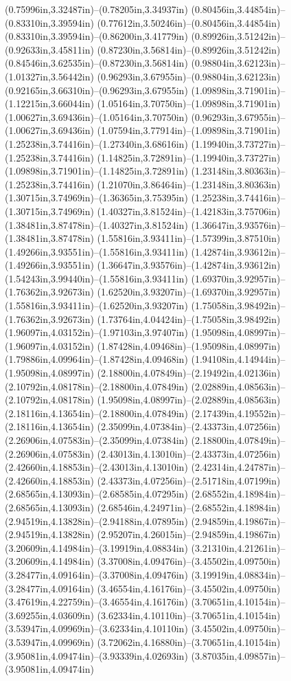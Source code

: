 (0.75996in,3.32487in)--(0.78205in,3.34937in) (0.80456in,3.44854in)--(0.83310in,3.39594in) (0.77612in,3.50246in)--(0.80456in,3.44854in) (0.83310in,3.39594in)--(0.86200in,3.41779in) (0.89926in,3.51242in)--(0.92633in,3.45811in) (0.87230in,3.56814in)--(0.89926in,3.51242in) (0.84546in,3.62535in)--(0.87230in,3.56814in) (0.98804in,3.62123in)--(1.01327in,3.56442in) (0.96293in,3.67955in)--(0.98804in,3.62123in) (0.92165in,3.66310in)--(0.96293in,3.67955in) (1.09898in,3.71901in)--(1.12215in,3.66044in) (1.05164in,3.70750in)--(1.09898in,3.71901in) (1.00627in,3.69436in)--(1.05164in,3.70750in) (0.96293in,3.67955in)--(1.00627in,3.69436in) (1.07594in,3.77914in)--(1.09898in,3.71901in) (1.25238in,3.74416in)--(1.27340in,3.68616in) (1.19940in,3.73727in)--(1.25238in,3.74416in) (1.14825in,3.72891in)--(1.19940in,3.73727in) (1.09898in,3.71901in)--(1.14825in,3.72891in) (1.23148in,3.80363in)--(1.25238in,3.74416in) (1.21070in,3.86464in)--(1.23148in,3.80363in) (1.30715in,3.74969in)--(1.36365in,3.75395in) (1.25238in,3.74416in)--(1.30715in,3.74969in) (1.40327in,3.81524in)--(1.42183in,3.75706in) (1.38481in,3.87478in)--(1.40327in,3.81524in) (1.36647in,3.93576in)--(1.38481in,3.87478in) (1.55816in,3.93411in)--(1.57399in,3.87510in) (1.49266in,3.93551in)--(1.55816in,3.93411in) (1.42874in,3.93612in)--(1.49266in,3.93551in) (1.36647in,3.93576in)--(1.42874in,3.93612in) (1.54243in,3.99440in)--(1.55816in,3.93411in) (1.69370in,3.92957in)--(1.76362in,3.92673in) (1.62520in,3.93207in)--(1.69370in,3.92957in) (1.55816in,3.93411in)--(1.62520in,3.93207in) (1.75058in,3.98492in)--(1.76362in,3.92673in) (1.73764in,4.04424in)--(1.75058in,3.98492in) (1.96097in,4.03152in)--(1.97103in,3.97407in) (1.95098in,4.08997in)--(1.96097in,4.03152in) (1.87428in,4.09468in)--(1.95098in,4.08997in) (1.79886in,4.09964in)--(1.87428in,4.09468in) (1.94108in,4.14944in)--(1.95098in,4.08997in) (2.18800in,4.07849in)--(2.19492in,4.02136in) (2.10792in,4.08178in)--(2.18800in,4.07849in) (2.02889in,4.08563in)--(2.10792in,4.08178in) (1.95098in,4.08997in)--(2.02889in,4.08563in) (2.18116in,4.13654in)--(2.18800in,4.07849in) (2.17439in,4.19552in)--(2.18116in,4.13654in) (2.35099in,4.07384in)--(2.43373in,4.07256in) (2.26906in,4.07583in)--(2.35099in,4.07384in) (2.18800in,4.07849in)--(2.26906in,4.07583in) (2.43013in,4.13010in)--(2.43373in,4.07256in) (2.42660in,4.18853in)--(2.43013in,4.13010in) (2.42314in,4.24787in)--(2.42660in,4.18853in) (2.43373in,4.07256in)--(2.51718in,4.07199in) (2.68565in,4.13093in)--(2.68585in,4.07295in) (2.68552in,4.18984in)--(2.68565in,4.13093in) (2.68546in,4.24971in)--(2.68552in,4.18984in) (2.94519in,4.13828in)--(2.94188in,4.07895in) (2.94859in,4.19867in)--(2.94519in,4.13828in) (2.95207in,4.26015in)--(2.94859in,4.19867in) (3.20609in,4.14984in)--(3.19919in,4.08834in) (3.21310in,4.21261in)--(3.20609in,4.14984in) (3.37008in,4.09476in)--(3.45502in,4.09750in) (3.28477in,4.09164in)--(3.37008in,4.09476in) (3.19919in,4.08834in)--(3.28477in,4.09164in) (3.46554in,4.16176in)--(3.45502in,4.09750in) (3.47619in,4.22759in)--(3.46554in,4.16176in) (3.70651in,4.10154in)--(3.69255in,4.03609in) (3.62334in,4.10110in)--(3.70651in,4.10154in) (3.53947in,4.09969in)--(3.62334in,4.10110in) (3.45502in,4.09750in)--(3.53947in,4.09969in) (3.72062in,4.16880in)--(3.70651in,4.10154in) (3.95081in,4.09474in)--(3.93339in,4.02693in) (3.87035in,4.09857in)--(3.95081in,4.09474in) 
